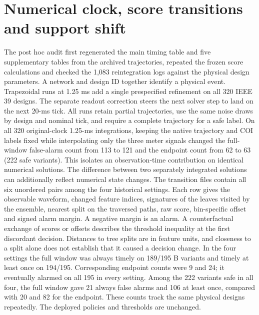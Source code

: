 \documentclass[10pt]{article}
\begin{document}
\section{Numerical clock, score transitions and support shift}
The post hoc audit first regenerated the main timing table and five supplementary tables from the archived trajectories, repeated the frozen score calculations and checked the 1,083 reintegration logs against the physical design parameters. A network and design ID together identify a physical event. Trapezoidal runs at 1.25 ms add a single prespecified refinement on all 320 IEEE 39 designs. The separate readout correction steers the next solver step to land on the next 20-ms tick. All runs retain partial trajectories, use the same noise draws by design and nominal tick, and require a complete trajectory for a safe label.
On all 320 original-clock 1.25-ms integrations, keeping the native trajectory and COI labels fixed while interpolating only the three meter signals changed the full-window false-alarm count from 113 to 121 and the endpoint count from 62 to 63 (222 safe variants). This isolates an observation-time contribution on identical numerical solutions. The difference between two separately integrated solutions can additionally reflect numerical state changes. The transition files contain all six unordered pairs among the four historical settings. Each row gives the observable waveform, changed feature indices, signatures of the leaves visited by the ensemble, nearest split on the traversed paths, raw score, bin-specific offset and signed alarm margin. A negative margin is an alarm. A counterfactual exchange of scores or offsets describes the threshold inequality at the first discordant decision. Distances to tree splits are in feature units, and closeness to a split alone does not establish that it caused a decision change.
In the four settings the full window was always timely on 189/195 B variants and timely at least once on 194/195. Corresponding endpoint counts were 9 and 24; it eventually alarmed on all 195 in every setting. Among the 222 variants safe in all four, the full window gave 21 always false alarms and 106 at least once, compared with 20 and 82 for the endpoint. These counts track the same physical designs repeatedly. The deployed policies and thresholds are unchanged.
\end{document}
